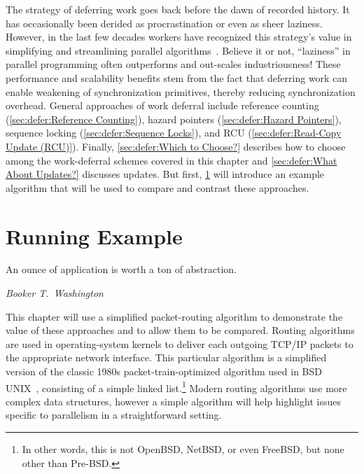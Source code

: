 
%

The strategy of deferring work goes back before the dawn of recorded
history. It has occasionally been derided as procrastination or
even as sheer laziness.
However, in the last few decades workers have recognized this strategy's value
in simplifying and streamlining parallel algorithms~\cite{Kung80,HMassalinPhD}.
Believe it or not, ``laziness'' in parallel programming often outperforms and
out-scales industriousness!
These performance and scalability benefits stem from the fact that
deferring work can enable weakening of synchronization primitives,
thereby reducing synchronization overhead.
General approaches of work deferral include
reference counting (\cref{sec:defer:Reference Counting}),
hazard pointers (\cref{sec:defer:Hazard Pointers}),
sequence locking (\cref{sec:defer:Sequence Locks}),
and RCU (\cref{sec:defer:Read-Copy Update (RCU)}).
Finally, \cref{sec:defer:Which to Choose?}
describes how to choose among the work-deferral schemes covered in
this chapter and \cref{sec:defer:What About Updates?}
discusses updates.
But first, \cref{sec:defer:Running Example} will introduce an example
algorithm that will be used to compare and contrast these approaches.

\section{Running Example}
\label{sec:defer:Running Example}
%
\epigraph{An ounce of application is worth a ton of abstraction.}
	 {\emph{Booker T.~Washington}}

This chapter will use a simplified packet-routing algorithm to demonstrate
the value of these approaches and to allow them to be compared.
Routing algorithms are used in operating-system kernels to
deliver each outgoing TCP/IP packets to the appropriate network interface.
This particular algorithm is a simplified version of the classic 1980s
packet-train-optimized algorithm used in BSD UNIX~\cite{VanJacobson88},
consisting of a simple linked list.\footnote{
	In other words, this is not OpenBSD, NetBSD, or even
	FreeBSD, but none other than Pre-BSD.}
Modern routing algorithms use more complex data structures, however a
simple algorithm will help highlight issues specific to parallelism in
a straightforward setting.


